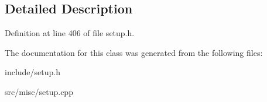 \subsection{Detailed Description}


Definition at line 406 of file setup.\-h.



The documentation for this class was generated from the following files\-:\begin{DoxyCompactItemize}
\item 
include/setup.\-h\item 
src/misc/setup.\-cpp\end{DoxyCompactItemize}
